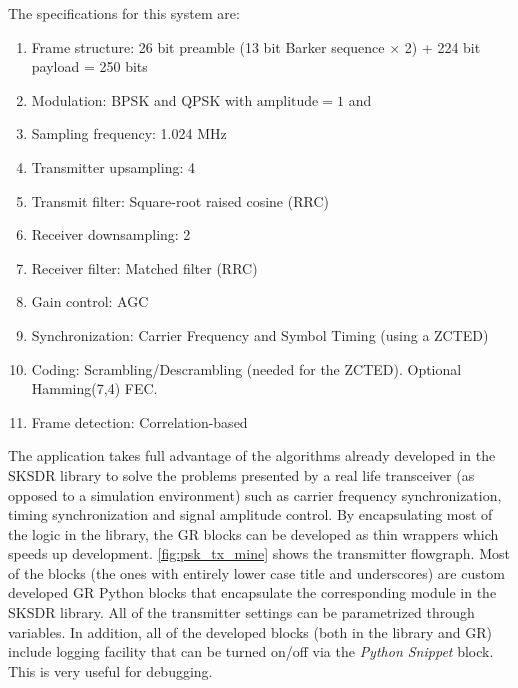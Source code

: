 The specifications for this system are:
\begin{enumerate}
  \item Frame structure: 26 bit preamble (13 bit Barker sequence $\times$ 2) + 224 bit payload = 250 bits
  \item Modulation: BPSK and QPSK with $\text{amplitude}=1$ and
  \item Sampling frequency: 1.024 MHz
  \item Transmitter upsampling: 4
  \item Transmit filter: Square-root raised cosine (RRC)
  \item Receiver downsampling: 2
  \item Receiver filter: Matched filter (RRC)
  \item Gain control: AGC
  \item Synchronization: Carrier Frequency and Symbol Timing (using a ZCTED)
  \item Coding: Scrambling/Descrambling (needed for the ZCTED). Optional Hamming(7,4) FEC.
  \item Frame detection: Correlation-based
\end{enumerate}

The application takes full advantage of the algorithms already developed in the SKSDR library to solve the problems presented by a real life transceiver (as opposed to a simulation environment) such as carrier frequency synchronization, timing synchronization and signal amplitude control.
By encapsulating most of the logic in the library, the GR blocks can be developed as thin wrappers which speeds up development. \autoref{fig:psk_tx_mine} shows the transmitter flowgraph. Most of the blocks (the ones with entirely lower case title and underscores) are custom developed GR Python blocks that encapsulate the corresponding module in the SKSDR library. All of the transmitter settings can be parametrized through variables. In addition, all of the developed blocks (both in the library and GR) include logging facility that can be turned on/off via the \emph{Python Snippet} block. This is very useful for debugging.

